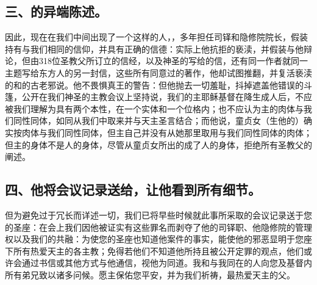 
\subsection{三、的异端陈述。}

因此，现在在我们中间出现了一个这样的人，，多年担任司铎和隐修院院长，假装持有与我们相同的信仰，并具有正确的信德：实际上他抗拒的亵渎，并假装与他辩论，但由318位圣教父所订立的信经，以及神圣的写给的信，还有同一作者就同一主题写给东方人的另一封信，这些所有同意过的著作，他却试图推翻，并复活亵渎的和的古老邪说。他不畏惧真王的警告：但他抛去一切羞耻，抖掉遮盖他错误的斗篷，公开在我们神圣的主教会议上坚持说，我们的主耶稣基督在降生成人后，不应被我们理解为具有两个本性，在一个实体和一个位格内；也不应认为主的肉体与我们同性同体，如同从我们中取来并与天主圣言结合；而他说，童贞女（生他的）确实按肉体与我们同性同体，但主自己并没有从她那里取用与我们同性同体的肉体；但主的身体不是人的身体，尽管从童贞女所出的成了人的身体，拒绝所有圣教父的阐述。\par


\subsection{四、他将会议记录送给，让他看到所有细节。}

但为避免过于冗长而详述一切，我们已将早些时候就此事所采取的会议记录送于您的圣座：在会上我们因他被证实有这些罪名而剥夺了他的司铎职、他隐修院的管理权以及我们的共融：为使您的圣座也知道他案件的事实，能使他的邪恶显明于您座下所有热爱天主的各主教；免得若他们不知道他所持且被公开定罪的观点，他们或许会通过书信或其他方式与他通信，视他为同道。我和与我同在的人向您及基督内所有弟兄致以诸多问候。愿主保佑您平安，并为我们祈祷，最热爱天主的父。\par


